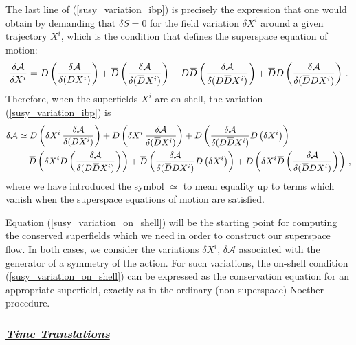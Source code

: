 \documentclass[12pt]{article}
\numberwithin{equation}{section}
\newcommand{\ul}{\underline}
\newcommand{\overbar}[1]{\mkern 1.5mu\overline{\mkern-1.5mu#1\mkern-1.5mu}\mkern 1.5mu}
\newcommand{\Dbar}{\overbar{D}}
\begin{document}
%
The last line of (\ref{susy_variation_ibp}) is precisely the expression that one would obtain by demanding that $\delta S = 0$ for the field variation $\delta X^i$ around a given trajectory $X^i$, which is the condition that defines the superspace equation of motion:
%
\begin{align}\label{susy_qm_eom}
    \frac{\delta \mathcal{A}}{\delta X^i} = D \left( \frac{\delta \mathcal{A}}{\delta ( D X^i ) } \right) + \Dbar \left( \frac{\delta \mathcal{A}}{\delta ( \Dbar X^i ) } \right) + D \Dbar \left( \frac{\delta \mathcal{A}}{\delta ( D \Dbar X^i ) } \right) + \Dbar D  \left( \frac{\delta \mathcal{A}}{\delta (  \Dbar D  X^i ) } \right) \, .
\end{align}
%
Therefore, when the superfields $X^i$ are on-shell, the variation (\ref{susy_variation_ibp}) is
%
\begin{align}\label{susy_variation_on_shell}
    \delta \mathcal{A} &\simeq D \left( \delta X^i  \, \frac{\delta \mathcal{A}}{\delta ( D X^i ) } \right) + \Dbar \left( \delta X^i  \, \frac{\delta \mathcal{A}}{\delta ( \Dbar X^i ) } \right) + D \left( \frac{\delta \mathcal{A}}{\delta (D \Dbar X^i)} \Dbar \left( \delta X^i \right) \right)  \nonumber \\
    &+ \Dbar \left( \delta X^i D \left( \frac{\delta \mathcal{A}}{\delta (D \Dbar X^i)} \right) \right) + \Dbar \left( \frac{\delta \mathcal{A}}{\delta  (\Dbar D  X^i)} D \left( \delta X^i \right) \right) + D \left( \delta X^i \Dbar \left( \frac{\delta \mathcal{A}}{\delta (\Dbar D X^i)} \right) \right) \, ,
\end{align}
%
where we have introduced the symbol $\simeq$ to mean equality up to terms which vanish when the superspace equations of motion are satisfied.

Equation (\ref{susy_variation_on_shell}) will be the starting point for computing the conserved superfields which we need in order to construct our superspace flow. In both cases, we consider the variations $\delta X^i$, $\delta \mathcal{A}$ associated with the generator of a symmetry of the action. For such variations, the on-shell condition (\ref{susy_variation_on_shell}) can be expressed as the conservation equation for an appropriate superfield, exactly as in the ordinary (non-superspace) Noether procedure.

\subsubsection*{\ul{\it Time Translations}}
\end{document}
